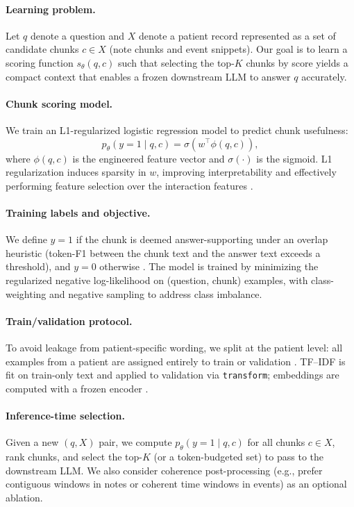 \paragraph{Learning problem.}
Let $q$ denote a question and $X$ denote a patient record represented as a set of candidate chunks $c \in X$ (note chunks and event snippets). Our goal is to learn a scoring function $s_\theta(q,c)$ such that selecting the top-$K$ chunks by score yields a compact context that enables a frozen downstream LLM to answer $q$ accurately.

\paragraph{Chunk scoring model.}
We train an L1-regularized logistic regression model to predict chunk usefulness:
\[
p_\theta(y=1 \mid q,c) = \sigma\left(w^\top \phi(q,c)\right),
\]
where $\phi(q,c)$ is the engineered feature vector and $\sigma(\cdot)$ is the sigmoid. L1 regularization induces sparsity in $w$, improving interpretability and effectively performing feature selection over the interaction features .

\paragraph{Training labels and objective.}
We define $y=1$ if the chunk is deemed answer-supporting under an overlap heuristic (token-F1 between the chunk text and the answer text exceeds a threshold), and $y=0$ otherwise . The model is trained by minimizing the regularized negative log-likelihood on (question, chunk) examples, with class-weighting and negative sampling to address class imbalance.

\paragraph{Train/validation protocol.}
To avoid leakage from patient-specific wording, we split at the patient level: all examples from a patient are assigned entirely to train or validation . TF--IDF is fit on train-only text and applied to validation via \texttt{transform}; embeddings are computed with a frozen encoder .

\paragraph{Inference-time selection.}
Given a new $(q,X)$ pair, we compute $p_\theta(y=1\mid q,c)$ for all chunks $c \in X$, rank chunks, and select the top-$K$ (or a token-budgeted set) to pass to the downstream LLM. We also consider coherence post-processing (e.g., prefer contiguous windows in notes or coherent time windows in events) as an optional ablation.

